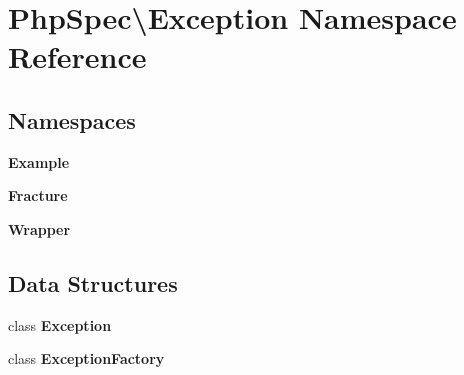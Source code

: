\section{Php\+Spec\textbackslash{}Exception Namespace Reference}
\label{namespace_php_spec_1_1_exception}
\subsection*{Namespaces}
\begin{DoxyCompactItemize}
\item 
 {\bf Example}
\item 
 {\bf Fracture}
\item 
 {\bf Wrapper}
\end{DoxyCompactItemize}
\subsection*{Data Structures}
\begin{DoxyCompactItemize}
\item 
class {\bf Exception}
\item 
class {\bf Exception\+Factory}
\end{DoxyCompactItemize}

